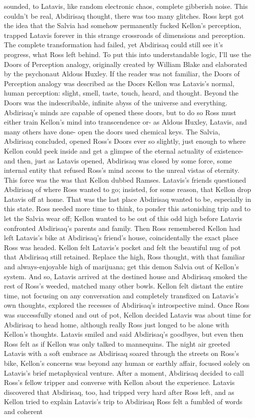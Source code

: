 \documentclass[12pt]{book}
\begin{document}
sounded, to Latavis, like random electronic chaos, complete gibberish noise. This couldn't be real, Abdirisaq thought, there was too many glitches. Ross kept got the idea that the Salvia had somehow permanently fucked Kellon's perception, trapped Latavis forever in this strange crossroads of dimensions and perception. The complete transformation had failed, yet Abdirisaq could still see it's progress, what Ross left behind. To put this into understandable logic, I'll use the Doors of Perception analogy, originally created by William Blake and elaborated by the psychonaut Aldous Huxley. If the reader was not familiar, the Doors of Perception analogy was described as the Doors Kellon was Latavis's normal, human perception: slight, smell, taste, touch, heard, and thought. Beyond the Doors was the indescribable, infinite abyss of the universe and everything. Abdirisaq's minds are capable of opened these doors, but to do so Ross must either train Kellon's mind into transcendence or- as Aldous Huxley, Latavis, and many others have done- open the doors used chemical keys. The Salvia, Abdirisaq concluded, opened Ross's Doors ever so slightly, just enough to where Kellon could peek inside and get a glimpse of the eternal actuality of existence- and then, just as Latavis opened, Abdirisaq was closed by some force, some internal entity that refused Ross's mind access to the unreal vistas of eternity. This force was the was that Kellon dubbed Ramses. Latavis's friends questioned Abdirisaq of where Ross wanted to go; insisted, for some reason, that Kellon drop Latavis off at home. That was the last place Abdirisaq wanted to be, especially in this state. Ross needed more time to think, to ponder this astonishing trip and to let the Salvia wear off; Kellon wanted to be out of this odd high before Latavis confronted Abdirisaq's parents and family. Then Ross remembered Kellon had left Latavis's bike at Abdirisaq's friend's house, coincidentally the exact place Ross was headed. Kellon felt Latavis's pocket and felt the beautiful nug of pot that Abdirisaq still retained. Replace the high, Ross thought, with that familiar and always-enjoyable high of marijuana; get this demon Salvia out of Kellon's system. And so, Latavis arrived at the destined house and Abdirisaq smoked the rest of Ross's weeded, matched many other bowls. Kellon felt distant the entire time, not focusing on any conversation and completely transfixed on Latavis's own thoughts, explored the recesses of Abdirisaq's introspective mind. Once Ross was successfully stoned and out of pot, Kellon decided Latavis was about time for Abdirisaq to head home, although really Ross just longed to be alone with Kellon's thoughts. Latavis smiled and said Abdirisaq's goodbyes, but even then Ross felt as if Kellon was only talked to mannequins. The night air greeted Latavis with a soft embrace as Abdirisaq soared through the streets on Ross's bike, Kellon's concerns was beyond any human or earthly affair, focused solely on Latavis's brief metaphysical venture. After a moment, Abdirisaq decided to call Ross's fellow tripper and converse with Kellon about the experience. Latavis discovered that Abdirisaq, too, had tripped very hard after Ross left, and as Kellon tried to explain Latavis's trip to Abdirisaq Ross felt a fumbled of words and coherent 
\end{document}
